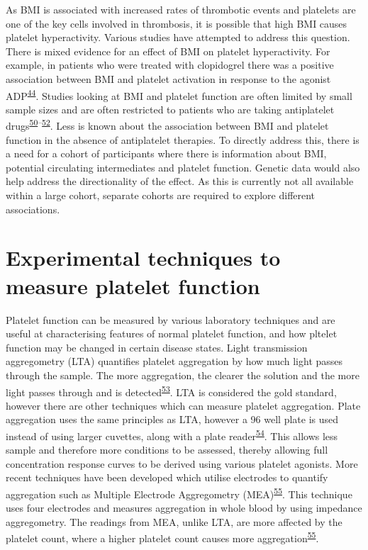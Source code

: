 \documentclass[11pt,twoside]{bristolthesis}
\begin{document}
As BMI is associated with increased rates of thrombotic events and platelets are one of the key cells involved in thrombosis, it is possible that high BMI causes platelet hyperactivity. Various studies have attempted to address this question. There is mixed evidence for an effect of BMI on platelet hyperactivity. For example, in patients who were treated with clopidogrel there was a positive association between BMI and platelet activation in response to the agonist ADP\textsuperscript{\protect\hyperlink{ref-Nardin2015}{44}}. Studies looking at BMI and platelet function are often limited by small sample sizes and are often restricted to patients who are taking antiplatelet drugs\textsuperscript{\protect\hyperlink{ref-Deharo2014}{50}--\protect\hyperlink{ref-Pankert2014}{52}}. Less is known about the association between BMI and platelet function in the absence of antiplatelet therapies. To directly address this, there is a need for a cohort of participants where there is information about BMI, potential circulating intermediates and platelet function. Genetic data would also help address the directionality of the effect. As this is currently not all available within a large cohort, separate cohorts are required to explore different associations.

\hypertarget{platelet-function-techniques}{%
\section{Experimental techniques to measure platelet function}\label{platelet-function-techniques}}

Platelet function can be measured by various laboratory techniques and are useful at characterising features of normal platelet function, and how pltelet function may be changed in certain disease states. Light transmission aggregometry (LTA) quantifies platelet aggregation by how much light passes through the sample. The more aggregation, the clearer the solution and the more light passes through and is detected\textsuperscript{\protect\hyperlink{ref-Born1962}{53}}. LTA is considered the gold standard, however there are other techniques which can measure platelet aggregation. Plate aggregation uses the same principles as LTA, however a 96 well plate is used instead of using larger cuvettes, along with a plate reader\textsuperscript{\protect\hyperlink{ref-Chan2018}{54}}. This allows less sample and therefore more conditions to be assessed, thereby allowing full concentration response curves to be derived using various platelet agonists. More recent techniques have been developed which utilise electrodes to quantify aggregation such as Multiple Electrode Aggregometry (MEA)\textsuperscript{\protect\hyperlink{ref-Toth2006}{55}}. This technique uses four electrodes and measures aggregation in whole blood by using impedance aggregometry. The readings from MEA, unlike LTA, are more affected by the platelet count, where a higher platelet count causes more aggregation\textsuperscript{\protect\hyperlink{ref-Toth2006}{55}}.
\end{document}
